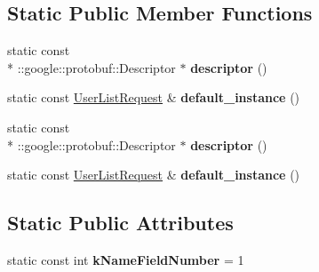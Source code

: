 \subsection*{Static Public Member Functions}
\begin{DoxyCompactItemize}
\item 
\hypertarget{classSimpleChat_1_1UserListRequest_afe82b71cdd6ebbe7d791368891aab37d}{static const \\*
\-::google\-::protobuf\-::\-Descriptor $\ast$ {\bfseries descriptor} ()}\label{classSimpleChat_1_1UserListRequest_afe82b71cdd6ebbe7d791368891aab37d}

\item 
\hypertarget{classSimpleChat_1_1UserListRequest_a8e0204f2d4f7d94fb6ed7789a69cd19c}{static const \hyperlink{classSimpleChat_1_1UserListRequest}{User\-List\-Request} \& {\bfseries default\-\_\-instance} ()}\label{classSimpleChat_1_1UserListRequest_a8e0204f2d4f7d94fb6ed7789a69cd19c}

\item 
\hypertarget{classSimpleChat_1_1UserListRequest_afe82b71cdd6ebbe7d791368891aab37d}{static const \\*
\-::google\-::protobuf\-::\-Descriptor $\ast$ {\bfseries descriptor} ()}\label{classSimpleChat_1_1UserListRequest_afe82b71cdd6ebbe7d791368891aab37d}

\item 
\hypertarget{classSimpleChat_1_1UserListRequest_a8e0204f2d4f7d94fb6ed7789a69cd19c}{static const \hyperlink{classSimpleChat_1_1UserListRequest}{User\-List\-Request} \& {\bfseries default\-\_\-instance} ()}\label{classSimpleChat_1_1UserListRequest_a8e0204f2d4f7d94fb6ed7789a69cd19c}

\end{DoxyCompactItemize}
\subsection*{Static Public Attributes}
\begin{DoxyCompactItemize}
\item 
\hypertarget{classSimpleChat_1_1UserListRequest_a141c9f1c415b6dff6bb5fe1855685fd6}{static const int {\bfseries k\-Name\-Field\-Number} = 1}\label{classSimpleChat_1_1UserListRequest_a141c9f1c415b6dff6bb5fe1855685fd6}

\end{DoxyCompactItemize}
